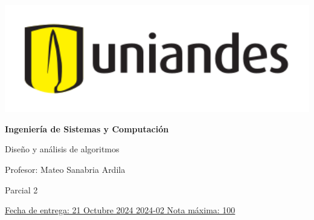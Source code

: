 \documentclass[12pt, a4paper]{exam}
\begin{document}
	\noindent
	\begin{minipage}[l]{0.1\textwidth}
		\noindent
		\includegraphics[width=1.8\textwidth]{Logosimbolo-uniandes_horizontal.png}
	\end{minipage}
\hfill
\begin{minipage}[c]{0.8\textwidth}
	\begin{center}
		{\large \textbf{Ingeniería de Sistemas y Computación} \par
		\large	Diseño y análisis de algoritmos	\par
		\small  Profesor: Mateo Sanabria Ardila	\par
		\small  Parcial 2	\par
		}
	\end{center}
\end{minipage}
\par
\vspace{0.2in}
\noindent
\uline{Fecha de entrega: 21 Octubre 2024	\hfill  2024-02		\hfill Nota máxima: 100}
\par 
\vspace{0.15in}
\end{document}
